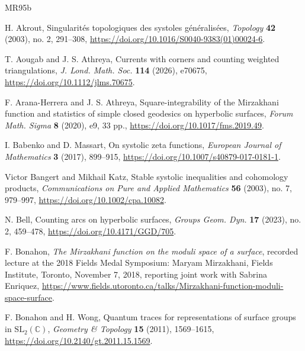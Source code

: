\documentclass[10pt,twoside]{article}
\theoremstyle{plain}
\theoremstyle{definition}
\theoremstyle{remark}
\begin{document}
\small
\begin{thebibliography}{MR95b}

H. Akrout,
Singularit\'es topologiques des systoles g\'en\'eralis\'ees,
\emph{Topology} \textbf{42} (2003), no. 2, 291--308,
\url{https://doi.org/10.1016/S0040-9383(01)00024-6}.

T. Aougab and J. S. Athreya,
Currents with corners and counting weighted triangulations,
\emph{J. Lond. Math. Soc.} \textbf{114} (2026), e70675,
\url{https://doi.org/10.1112/jlms.70675}.

F. Arana-Herrera and J. S. Athreya,
Square-integrability of the Mirzakhani function and statistics of simple
closed geodesics on hyperbolic surfaces,
\emph{Forum Math. Sigma} \textbf{8} (2020), e9, 33 pp.,
\url{https://doi.org/10.1017/fms.2019.49}.

I. Babenko and D. Massart,
On systolic zeta functions,
\emph{European Journal of Mathematics} \textbf{3} (2017), 899--915,
\url{https://doi.org/10.1007/s40879-017-0181-1}.

Victor Bangert and Mikhail Katz,
Stable systolic inequalities and cohomology products,
\emph{Communications on Pure and Applied Mathematics}
\textbf{56} (2003), no. 7, 979--997,
\url{https://doi.org/10.1002/cpa.10082}.

N. Bell,
Counting arcs on hyperbolic surfaces,
\emph{Groups Geom. Dyn.} \textbf{17} (2023), no. 2, 459--478,
\url{https://doi.org/10.4171/GGD/705}.

F. Bonahon,
\emph{The Mirzakhani function on the moduli space of a surface},
recorded lecture at the 2018 Fields Medal Symposium: Maryam Mirzakhani,
Fields Institute, Toronto, November 7, 2018,
reporting joint work with Sabrina Enriquez,
\url{https://www.fields.utoronto.ca/talks/Mirzakhani-function-moduli-space-surface}.

F. Bonahon and H. Wong,
Quantum traces for representations of surface groups in
$\mathrm{SL}_2(\mathbb C)$,
\emph{Geometry \& Topology} \textbf{15} (2011), 1569--1615,
\url{https://doi.org/10.2140/gt.2011.15.1569}.



\end{thebibliography}
\end{document}
